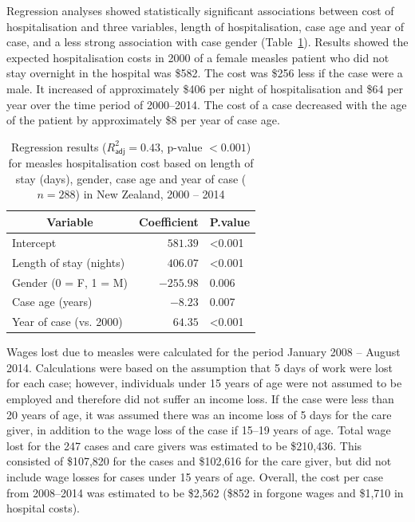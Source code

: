 \documentclass{article}
\begin{document}
Regression analyses showed statistically significant associations between cost of hospitalisation and three variables, length of hospitalisation, case age and year of case, and a less strong association with case gender (Table~\ref{table:regression}). Results showed the expected hospitalisation costs in 2000 of a female measles patient who did not stay overnight in the hospital was \$582.  The cost was \$256 less if the case were a male. It increased of approximately \$406 per night of hospitalisation and \$64 per year over the time period of 2000--2014. The cost of a case decreased with the age of the patient by approximately \$8 per year of case age.


\begin{table}
\caption{Regression results ($R^{2}_\textsf{adj} = 0.43$, p-value $<0.001$) for measles hospitalisation cost based on length of stay (days), gender, case age and year of case ($n=288$) in New Zealand, 2000 -- 2014}
\begin{center}
\begin{tabular}{lrl}
\hline\hline
\multicolumn{1}{c}{Variable}&\multicolumn{1}{c}{Coefficient}&\multicolumn{1}{c}{P.value}\tabularnewline
\hline
Intercept&$ 581.39$&\textless  0.001\tabularnewline
Length of stay (nights)&$ 406.07$&\textless  0.001\tabularnewline
Gender (0 = F, 1 = M)&$-255.98$&0.006\tabularnewline
Case age (years)&$  -8.23$&0.007\tabularnewline
Year of case (vs. 2000)&$  64.35$&\textless  0.001\tabularnewline
\hline
\end{tabular}\end{center}\label{table:regression}
\end{table}

Wages lost due to measles were calculated for the period January 2008 -- August 2014. Calculations were based on the assumption that 5 days of work were lost for each case; however, individuals under 15 years of age were not assumed to be employed and therefore did not suffer an income loss. If the case were less than 20 years of age, it was assumed there was an income loss of 5 days for the care giver, in addition to the wage loss of the case if 15--19 years of age. Total wage lost for the 247 cases and care givers was estimated to be \$210,436. This consisted of \$107,820 for the cases and \$102,616 for the care giver, but did not include wage losses for cases under 15 years of age. Overall, the cost per case from 2008--2014 was estimated to be \$2,562 (\$852 in forgone wages and \$1,710 in hospital costs).
\end{document}
